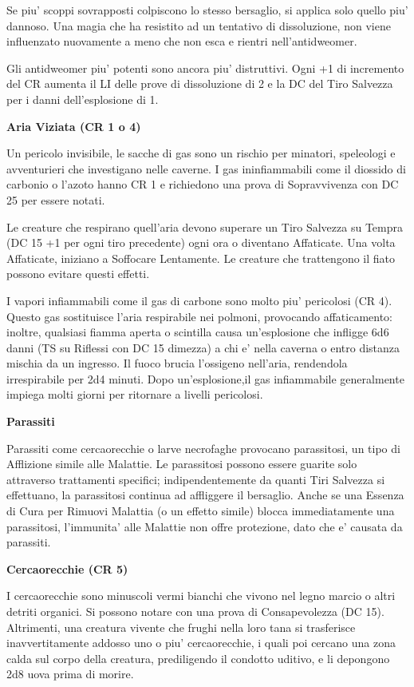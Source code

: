 \documentclass[a4paper,11pt,twoside,openany]{dndbook}
\begin{document}
Se piu' scoppi sovrapposti colpiscono lo stesso bersaglio, si applica solo quello piu' dannoso. Una magia che ha resistito ad un tentativo di dissoluzione, non viene influenzato nuovamente a meno che non esca e rientri nell'antidweomer.

Gli antidweomer piu' potenti sono ancora piu' distruttivi. Ogni +1 di incremento del CR aumenta il LI delle prove di dissoluzione di 2 e la DC del Tiro Salvezza per i danni dell'esplosione di 1.

\textbf{Aria Viziata (CR 1 o 4)}

Un pericolo invisibile, le sacche di gas sono un rischio per minatori, speleologi e avventurieri che investigano nelle caverne. I gas ininfiammabili come il diossido di carbonio o l'azoto hanno CR 1 e richiedono una prova di Sopravvivenza con DC 25 per essere notati. 

Le creature che respirano quell'aria devono superare un Tiro Salvezza su Tempra (DC 15 +1 per ogni tiro precedente) ogni ora o diventano Affaticate. Una volta Affaticate, iniziano a Soffocare Lentamente. Le creature che trattengono il fiato possono evitare questi effetti.

I vapori infiammabili come il gas di carbone sono molto piu' pericolosi (CR 4). Questo gas sostituisce l'aria respirabile nei polmoni, provocando affaticamento: inoltre, qualsiasi fiamma aperta o scintilla causa un'esplosione che infligge 6d6 danni (TS su Riflessi con DC 15 dimezza) a chi e' nella caverna o entro distanza mischia da un ingresso. Il fuoco brucia l'ossigeno nell'aria, rendendola irrespirabile per 2d4 minuti. Dopo un'esplosione,il gas infiammabile generalmente impiega molti giorni per ritornare a livelli pericolosi.

\textbf{Parassiti}

Parassiti come cercaorecchie o larve necrofaghe provocano parassitosi, un tipo di Afflizione simile alle Malattie. Le parassitosi possono essere guarite solo attraverso trattamenti specifici; indipendentemente da quanti Tiri Salvezza si effettuano, la parassitosi continua ad affliggere il bersaglio. Anche se una Essenza di Cura per Rimuovi Malattia (o un effetto simile) blocca immediatamente una parassitosi, l'immunita' alle Malattie non offre protezione, dato che e' causata da parassiti.

\textbf{Cercaorecchie (CR 5)}

I cercaorecchie sono minuscoli vermi bianchi che vivono nel legno marcio o altri detriti organici. Si possono notare con una prova di Consapevolezza (DC 15). Altrimenti, una creatura vivente che frughi nella loro tana si trasferisce inavvertitamente addosso uno o piu' cercaorecchie, i quali poi cercano una zona calda sul corpo della creatura, prediligendo il condotto uditivo, e li depongono 2d8 uova prima di morire. 
\end{document}
